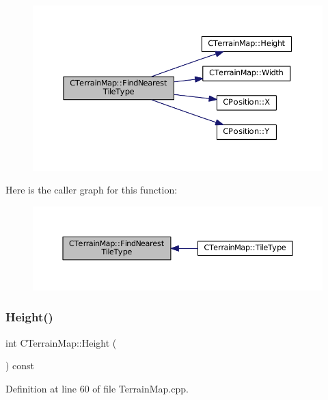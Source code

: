 \begin{figure}[H]
\begin{center}
\leavevmode
\includegraphics[width=350pt]{classCTerrainMap_af32811cace3a3b01c9519b304ddb8efc_cgraph}
\end{center}
\end{figure}
Here is the caller graph for this function\+:\nopagebreak
\begin{figure}[H]
\begin{center}
\leavevmode
\includegraphics[width=350pt]{classCTerrainMap_af32811cace3a3b01c9519b304ddb8efc_icgraph}
\end{center}
\end{figure}
\hypertarget{classCTerrainMap_ae5e4bf6507e0e3e9ac0322b43eed8a7a}{}\label{classCTerrainMap_ae5e4bf6507e0e3e9ac0322b43eed8a7a} 
\subsubsection{\texorpdfstring{Height()}{Height()}}
{\footnotesize\ttfamily int C\+Terrain\+Map\+::\+Height (\begin{DoxyParamCaption}{ }\end{DoxyParamCaption}) const}



Definition at line 60 of file Terrain\+Map.\+cpp.



